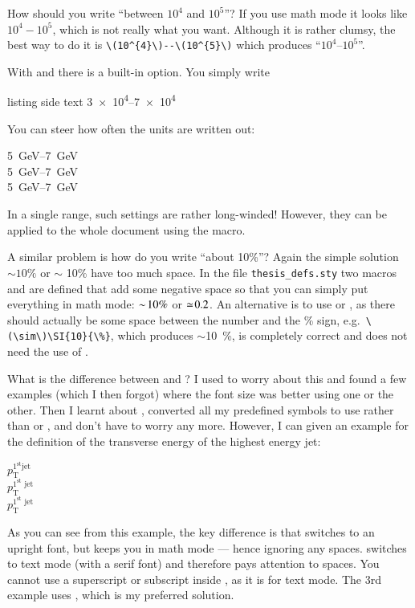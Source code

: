 How should you write \enquote{between \(10^{4}\) and \(10^{5}\)}?
If you use math mode it looks like \(10^{4} - 10^{5}\), which is not
really what you want. Although it is rather clumsy, the best way to do
it is \verb+\(10^{4}\)--\(10^{5}\)+ which produces
\enquote{\(10^{4}\)--\(10^{5}\)}.

With  and  there is a built-in option.
You simply write
\begin{tcblisting}{listing side text}
\numrange{3e4}{7e4}
\end{tcblisting}
You can steer how often the units are written out:
\begin{tcblisting}{}
\SIrange[range-units=repeat, range-phrase=--]{5}{7}{\GeV}\\
\SIrange[range-units=single, range-phrase=--]{5}{7}{\GeV}\\
\SIrange[range-units=brackets, range-phrase=--]{5}{7}{\GeV}
\end{tcblisting}
In a single range, such settings are rather long-winded!
However, they can be applied to the whole
document using the  macro.

A similar problem is how do you write \enquote{about 10\%}?  Again the
simple solution \(\sim 10\%\) or \(\sim\) 10\% have too much space. In the
file \texttt{thesis\_defs.sty} two macros  and
 are defined that add some negative space so that you
can simply put everything in math mode: \(\sim\! 10\%\) or \(\simeq\! 0.2\).
An alternative is to use  or , as there
should actually be some space between the number and the \% sign,
e.g.\ \verb+\(\sim\)\SI{10}{\%}+, which produces \(\sim\)\SI{10}{\%}, is
completely correct and does not need the use of .

What is the difference between  and
? I used to worry about this and found a
few examples (which I then forgot) where the font size was better
using one or the other. Then I learnt about ,
converted all my predefined symbols to use  rather than
 or , and don't have to worry any
more. However, I can given an example for the definition
of the transverse energy of the highest energy jet:
\begin{tcblisting}{}
\(p_{\mathrm{T}}^{\mathrm{1^{\text{st}} jet}}\)\\
\(p_{\textrm{T}}^{\textrm{1}^{\text{st}}\textrm{ jet}}\)\\
\(p_{\text{T}}^{1^{\text{st}}\text{ jet}}\)
\end{tcblisting}
As you can see
from this example, the key difference is that  switches
to an upright font, but keeps you in math mode --- hence ignoring any
spaces.
 switches to text mode (with a serif font) and
therefore pays attention to spaces.
You cannot use a superscript or subscript inside ,
as it is for text mode.
The 3rd example uses , which is my preferred solution.

